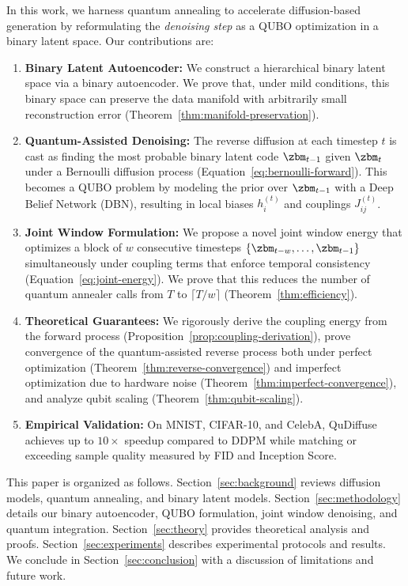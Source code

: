 \documentclass[11pt,letterpaper]{article}
\begin{document}
In this work, we harness quantum annealing to accelerate diffusion-based generation by reformulating the \emph{denoising step} as a QUBO optimization in a binary latent space. Our contributions are:
\begin{enumerate}[noitemsep,topsep=0pt]
    \item \textbf{Binary Latent Autoencoder:} We construct a hierarchical binary latent space via a binary autoencoder. We prove that, under mild conditions, this binary space can preserve the data manifold with arbitrarily small reconstruction error (Theorem~\ref{thm:manifold-preservation}).
    \item \textbf{Quantum-Assisted Denoising:} The reverse diffusion at each timestep $t$ is cast as finding the most probable binary latent code $\zbm_{t-1}$ given $\zbm_t$ under a Bernoulli diffusion process (Equation~\eqref{eq:bernoulli-forward}). This becomes a QUBO problem by modeling the prior over $\zbm_{t-1}$ with a Deep Belief Network (DBN), resulting in local biases $h_i^{(t)}$ and couplings $J_{ij}^{(t)}$.
    \item \textbf{Joint Window Formulation:} We propose a novel joint window energy that optimizes a block of $w$ consecutive timesteps $\{\zbm_{t-w}, \ldots, \zbm_{t-1}\}$ simultaneously under coupling terms that enforce temporal consistency (Equation~\eqref{eq:joint-energy}). We prove that this reduces the number of quantum annealer calls from $T$ to $\lceil T / w \rceil$ (Theorem~\ref{thm:efficiency}).
    \item \textbf{Theoretical Guarantees:} We rigorously derive the coupling energy from the forward process (Proposition~\ref{prop:coupling-derivation}), prove convergence of the quantum-assisted reverse process both under perfect optimization (Theorem~\ref{thm:reverse-convergence}) and imperfect optimization due to hardware noise (Theorem~\ref{thm:imperfect-convergence}), and analyze qubit scaling (Theorem~\ref{thm:qubit-scaling}).
    \item \textbf{Empirical Validation:} On MNIST, CIFAR-10, and CelebA, QuDiffuse achieves up to $10\times$ speedup compared to DDPM \cite{ho2020denoising} while matching or exceeding sample quality measured by FID and Inception Score.
\end{enumerate}

This paper is organized as follows. Section~\ref{sec:background} reviews diffusion models, quantum annealing, and binary latent models. Section~\ref{sec:methodology} details our binary autoencoder, QUBO formulation, joint window denoising, and quantum integration. Section~\ref{sec:theory} provides theoretical analysis and proofs. Section~\ref{sec:experiments} describes experimental protocols and results. We conclude in Section~\ref{sec:conclusion} with a discussion of limitations and future work.
\end{document}
